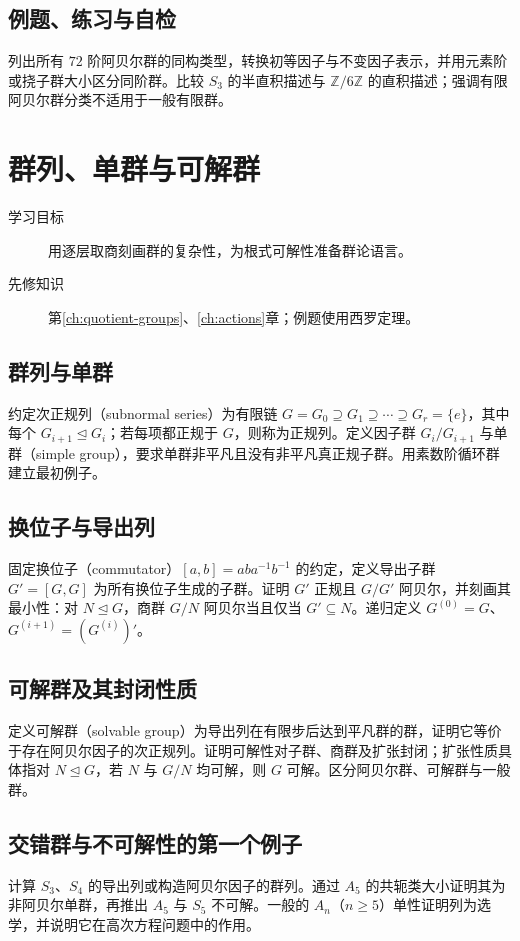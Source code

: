 \documentclass[UTF8,12pt,a4paper,fontset=fandol]{ctexbook}
\begin{document}
\section{例题、练习与自检}
列出所有 $72$ 阶阿贝尔群的同构类型，转换初等因子与不变因子表示，并用元素阶或挠子群大小区分同阶群。比较 $S_3$ 的半直积描述与 $\mathbb Z/6\mathbb Z$ 的直积描述；强调有限阿贝尔群分类不适用于一般有限群。

\chapter{群列、单群与可解群}\label{ch:solvable-groups}

\begin{description}
  \item[学习目标] 用逐层取商刻画群的复杂性，为根式可解性准备群论语言。
  \item[先修知识] 第\ref{ch:quotient-groups}、\ref{ch:actions}章；例题使用西罗定理。
\end{description}

\section{群列与单群}
约定次正规列（subnormal series）为有限链 $G=G_0\supseteq G_1\supseteq\cdots\supseteq G_r=\{e\}$，其中每个 $G_{i+1}\trianglelefteq G_i$；若每项都正规于 $G$，则称为正规列。定义因子群 $G_i/G_{i+1}$ 与单群（simple group），要求单群非平凡且没有非平凡真正规子群。用素数阶循环群建立最初例子。

\section{换位子与导出列}
固定换位子（commutator）$[a,b]=aba^{-1}b^{-1}$ 的约定，定义导出子群 $G'=[G,G]$ 为所有换位子生成的子群。证明 $G'$ 正规且 $G/G'$ 阿贝尔，并刻画其最小性：对 $N\trianglelefteq G$，商群 $G/N$ 阿贝尔当且仅当 $G'\subseteq N$。递归定义 $G^{(0)}=G$、$G^{(i+1)}=(G^{(i)})'$。

\section{可解群及其封闭性质}
定义可解群（solvable group）为导出列在有限步后达到平凡群的群，证明它等价于存在阿贝尔因子的次正规列。证明可解性对子群、商群及扩张封闭；扩张性质具体指对 $N\trianglelefteq G$，若 $N$ 与 $G/N$ 均可解，则 $G$ 可解。区分阿贝尔群、可解群与一般群。

\section{交错群与不可解性的第一个例子}
计算 $S_3$、$S_4$ 的导出列或构造阿贝尔因子的群列。通过 $A_5$ 的共轭类大小证明其为非阿贝尔单群，再推出 $A_5$ 与 $S_5$ 不可解。一般的 $A_n$（$n\geq5$）单性证明列为选学，并说明它在高次方程问题中的作用。
\end{document}
